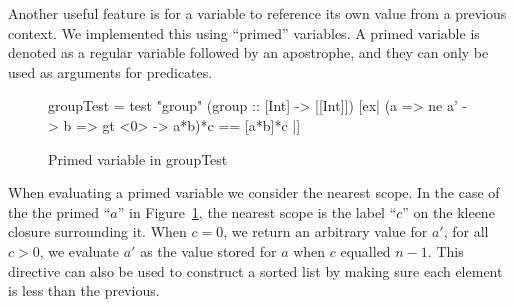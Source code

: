 Another useful feature is for a variable to reference its own value from a previous context. We implemented this using ``primed''
variables. A primed variable is denoted as a regular variable followed by an apostrophe, and they can only be used as arguments for 
predicates.

\begin{figure}
    \begin{smallhskcode}
groupTest = test "group"
        (group :: [Int] -> [[Int]])
        [ex| ({a => ne a'} -> {b => gt <0>} -> a*{b})*{c}
            == [a*{b}]*{c} |]
    \end{smallhskcode}
    \caption{Primed variable in groupTest}
    \label{fig:group-primed}
\end{figure}

When evaluating a primed variable we consider the nearest scope. In the case of the the primed ``$a$'' in Figure~\ref{fig:group-primed},
the nearest scope is the label ``$c$'' on the kleene closure surrounding it. When $c=0$, we return an arbitrary value for $a'$,
for all $c > 0$, we evaluate $a'$ as the value stored for $a$ when $c$ equalled $n-1$. This directive can also be used to construct
a sorted list by making sure each element is less than the previous. 

